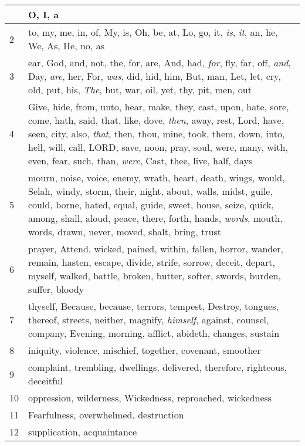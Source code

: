 \begin{longtable}{l|p{3.75in}}
\hline \hline
\endlastfoot
1 & O, I, a \\ \hline
2 & to, my, me, in, of, My, is, Oh, be, at, Lo, go, it, \emph{is}, \emph{it}, an, he, We, As, He, no, as \\ \hline
3 & ear, God, and, not, the, for, are, And, had, \emph{for}, fly, far, off, \emph{and}, Day, \emph{are}, her, For, \emph{was}, did, hid, him, But, man, Let, let, cry, old, put, his, \emph{The}, but, war, oil, yet, thy, pit, men, out \\ \hline
4 & Give, hide, from, unto, hear, make, they, cast, upon, hate, sore, come, hath, said, that, like, dove, \emph{then}, away, rest, Lord, have, seen, city, also, \emph{that}, then, thou, mine, took, them, down, into, hell, will, call, LORD, save, noon, pray, soul, were, many, with, even, fear, such, than, \emph{were}, Cast, thee, live, half, days \\ \hline
5 & mourn, noise, voice, enemy, wrath, heart, death, wings, would, Selah, windy, storm, their, night, about, walls, midst, guile, could, borne, hated, equal, guide, sweet, house, seize, quick, among, shall, aloud, peace, there, forth, hands, \emph{words}, mouth, words, drawn, never, moved, shalt, bring, trust \\ \hline
6 & prayer, Attend, wicked, pained, within, fallen, horror, wander, remain, hasten, escape, divide, strife, sorrow, deceit, depart, myself, walked, battle, broken, butter, softer, swords, burden, suffer, bloody \\ \hline
7 & thyself, Because, because, terrors, tempest, Destroy, tongues, thereof, streets, neither, magnify, \emph{himself}, against, counsel, company, Evening, morning, afflict, abideth, changes, sustain \\ \hline
8 & iniquity, violence, mischief, together, covenant, smoother \\ \hline
9 & complaint, trembling, dwellings, delivered, therefore, righteous, deceitful \\ \hline
10 & oppression, wilderness, Wickedness, reproached, wickedness \\ \hline
11 & Fearfulness, overwhelmed, destruction \\ \hline
12 & supplication, acquaintance \\ \hline
\end{longtable}






 



